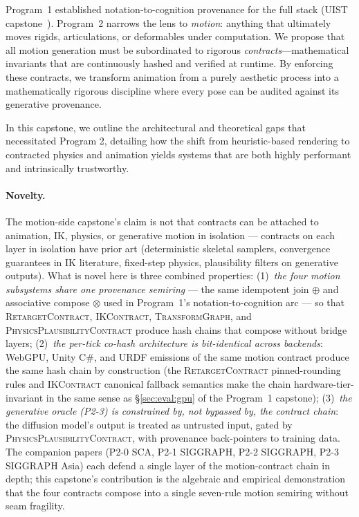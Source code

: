 \documentclass[sigconf,nonacm]{acmart}
\newcommand{\retargetcontract}{\textsc{RetargetContract}}
\newcommand{\ikcontract}{\textsc{IKContract}}
\newcommand{\transformgraph}{\textsc{TransformGraph}}
\newcommand{\plausibility}{\textsc{PhysicsPlausibilityContract}}
\begin{document}
Program~1 established notation-to-cognition provenance for the full stack (UIST capstone~\cite{capstone-uist2027}). Program~2 narrows the lens to \emph{motion}: anything that ultimately moves rigids, articulations, or deformables under computation. We propose that all motion generation must be subordinated to rigorous \emph{contracts}---mathematical invariants that are continuously hashed and verified at runtime. By enforcing these contracts, we transform animation from a purely aesthetic process into a mathematically rigorous discipline where every pose can be audited against its generative provenance.

In this capstone, we outline the architectural and theoretical gaps that necessitated Program 2, detailing how the shift from heuristic-based rendering to contracted physics and animation yields systems that are both highly performant and intrinsically trustworthy.

\paragraph{Novelty.}
The motion-side capstone's claim is not that contracts can be attached to
animation, IK, physics, or generative motion in isolation --- contracts on
each layer in isolation have prior art (deterministic skeletal samplers,
convergence guarantees in IK literature, fixed-step physics, plausibility
filters on generative outputs). What is novel here is three combined
properties: (1)~\emph{the four motion subsystems share one provenance
semiring} --- the same idempotent join $\oplus$ and associative compose
$\otimes$ used in Program~1's notation-to-cognition arc --- so that
\retargetcontract{}, \ikcontract{}, \transformgraph{}, and
\plausibility{} produce hash chains that compose without bridge layers;
(2)~\emph{the per-tick co-hash architecture is bit-identical across
backends}: WebGPU, Unity C\#, and URDF emissions of the same motion
contract produce the same hash chain by construction (the
\retargetcontract{} pinned-rounding rules and \ikcontract{} canonical
fallback semantics make the chain hardware-tier-invariant in the same
sense as \S\ref{sec:eval:gpu} of the Program~1 capstone); (3)~\emph{the
generative oracle (P2-3) is constrained by, not bypassed by, the
contract chain}: the diffusion model's output is treated as untrusted
input, gated by \plausibility{}, with provenance back-pointers to
training data. The companion papers (P2-0 SCA, P2-1 SIGGRAPH, P2-2
SIGGRAPH, P2-3 SIGGRAPH Asia) each defend a single layer of the
motion-contract chain in depth; this capstone's contribution is the
algebraic and empirical demonstration that the four contracts compose
into a single seven-rule motion semiring without seam fragility.
\end{document}
